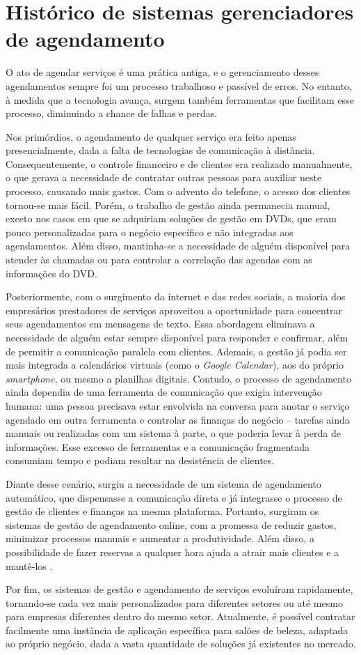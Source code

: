 \section{Histórico de sistemas gerenciadores de agendamento}

O ato de agendar serviços é uma prática antiga, e o gerenciamento desses agendamentos sempre foi um processo trabalhoso e passível de erros. No entanto, à medida que a tecnologia avança, surgem também ferramentas que facilitam esse processo, diminuindo a chance de falhas e perdas.

Nos primórdios, o agendamento de qualquer serviço era feito apenas presencialmente, dada a falta de tecnologias de comunicação à distância. Consequentemente, o controle financeiro e de clientes era realizado manualmente, o que gerava a necessidade de contratar outras pessoas para auxiliar neste processo, causando mais gastos. Com o advento do telefone, o acesso dos clientes tornou-se mais fácil. Porém, o trabalho de gestão ainda permanecia manual, exceto nos casos em que se adquiriam soluções de gestão em DVDs, que eram pouco personalizadas para o negócio específico e não integradas aos agendamentos. Além disso, mantinha-se a necessidade de alguém disponível para atender às chamadas ou para controlar a correlação das agendas com as informações do DVD.

Posteriormente, com o surgimento da internet e das redes sociais, a maioria dos empresários prestadores de serviços aproveitou a oportunidade para concentrar seus agendamentos em mensagens de texto. Essa abordagem eliminava a necessidade de alguém estar sempre disponível para responder e confirmar, além de permitir a comunicação paralela com clientes. Ademais, a gestão já podia ser mais integrada a calendários virtuais (como o \emph{Google Calendar}), aos do próprio \emph{smartphone}, ou mesmo a planilhas digitais. Contudo, o processo de agendamento ainda dependia de uma ferramenta de comunicação que exigia intervenção humana: uma pessoa precisava estar envolvida na conversa para anotar o serviço agendado em outra ferramenta e controlar as finanças do negócio – tarefas ainda manuais ou realizadas com um sistema à parte, o que poderia levar à perda de informações. Esse excesso de ferramentas e a comunicação fragmentada consumiam tempo e podiam resultar na desistência de clientes.

Diante desse cenário, surgiu a necessidade de um sistema de agendamento automático, que dispensasse a comunicação direta e já integrasse o processo de gestão de clientes e finanças na mesma plataforma. Portanto, surgiram os sistemas de gestão de agendamento online, com a promessa de reduzir gastos, minimizar processos manuais e aumentar a produtividade. Além disso, a possibilidade de fazer reservas a qualquer hora ajuda a atrair mais clientes e a mantê-los \cite{reservio}.

Por fim, os sistemas de gestão e agendamento de serviços evoluíram rapidamente, tornando-se cada vez mais personalizados para diferentes setores ou até mesmo para empresas diferentes dentro do mesmo setor. Atualmente, é possível contratar facilmente uma instância de aplicação específica para salões de beleza, adaptada ao próprio negócio, dada a vasta quantidade de soluções já existentes no mercado.